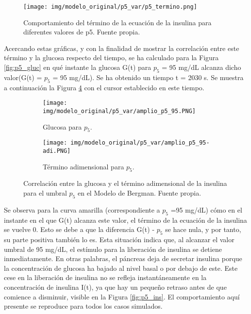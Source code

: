 \begin{figure}[htbp]
    \centering
    \texttt{[image: img/modelo\_original/p5\_var/p5\_termino.png]}
    \caption{Comportamiento del término de la ecuación de la insulina para diferentes valores de p5. Fuente propia.}
    \label{fig:termino_p5}
\end{figure}

Acercando estas gráficas, y con la finalidad de mostrar la correlación entre este término y la glucosa respecto del tiempo, se ha calculado para la Figura \ref{fig:p5_gluc} en qué instante la glucosa G(t) para $p_5$ = 95 mg/dL alcanza dicho valor(G(t) = $p_5$ = 95 mg/dL). Se ha obtenido un tiempo t = 2030 s. Se muestra a continuación la Figura \ref{fig:zoom_p5} con el cursor establecido en este tiempo.  
\clearpage

\begin{figure}[htbp]
    \centering
    \begin{subfigure}[b]{0.9\linewidth} %
        \centering
        \texttt{[image: img/modelo\_original/p5\_var/amplio\_p5\_95.PNG]}
        \caption{Glucosa para $p_5$.}
        \label{fig:p5_gluc_zoom}
    \end{subfigure}
    
    \vspace{0.5cm} %

    \begin{subfigure}[b]{0.9\linewidth} %
        \centering
        \texttt{[image: img/modelo\_original/p5\_var/amplio\_p5\_95-adi.PNG]}
        \caption{Término adimensional para $p_5$.}
        \label{fig:p5_adi_zoom}
    \end{subfigure}
    
    \caption{Correlación entre la glucosa y el término adimensional de la insulina para el umbral $p_5$ en el Modelo de Bergman. Fuente propia.}
    \label{fig:zoom_p5}
\end{figure}


Se observa para la curva amarilla (correspondiente a $p_5$ =95 mg/dL) cómo en el instante en el que G(t) alcanza este valor, el término de la ecuación de la insulina se vuelve 0. Esto se debe a que la diferencia G(t) - $p_5$ se hace nula, y por tanto, su parte positiva también lo es.
Esta situación indica que, al alcanzar el valor umbral de 95 mg/dL, el estímulo para la liberación de insulina se detiene inmediatamente. En otras palabras, el páncreas deja de secretar insulina porque la concentración de glucosa ha bajado al nivel basal o por debajo de este. Este cese en la liberación de insulina no se refleja instantáneamente en la concentración de insulina I(t), ya que hay un pequeño retraso antes de que comience a disminuir, visible en la Figura \ref{fig:p5_ins}. El comportamiento aquí presente se reproduce para todos los casos simulados.

